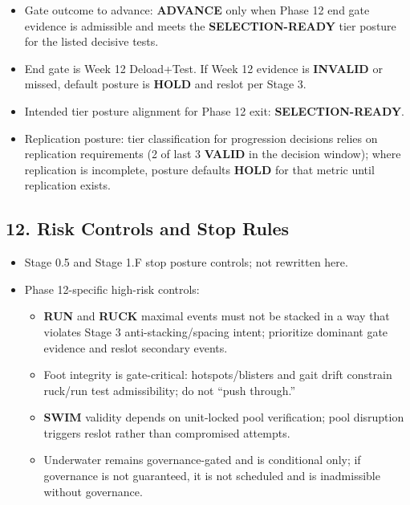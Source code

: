\documentclass[10pt]{article}
\begin{document}
\begin{itemize}
\item Gate outcome to advance: \textbf{ADVANCE} only when Phase 12 end gate evidence is admissible and meets the \textbf{SELECTION-READY} tier posture for the listed decisive tests.
\item End gate is Week 12 Deload+Test. If Week 12 evidence is \textbf{INVALID} or missed, default posture is \textbf{HOLD} and reslot per Stage 3.
\item Intended tier posture alignment for Phase 12 exit: \textbf{SELECTION-READY}.
\item Replication posture: tier classification for progression decisions relies on replication requirements (2 of last 3 \textbf{VALID} in the decision window); where replication is incomplete, posture defaults \textbf{HOLD} for that metric until replication exists.
\end{itemize}

\subsection*{12. Risk Controls and Stop Rules}


\begin{itemize}
\item Stage 0.5 and Stage 1.F stop posture controls; not rewritten here.
\item Phase 12-specific high-risk controls:
  \begin{itemize}
  \item \textbf{RUN} and \textbf{RUCK} maximal events must not be stacked in a way that violates Stage 3 anti-stacking/spacing intent; prioritize dominant gate evidence and reslot secondary events.
  \item Foot integrity is gate-critical: hotspots/blisters and gait drift constrain ruck/run test admissibility; do not “push through.”
  \item \textbf{SWIM} validity depends on unit-locked pool verification; pool disruption triggers reslot rather than compromised attempts.
  \item Underwater remains governance-gated and is conditional only; if governance is not guaranteed, it is not scheduled and is inadmissible without governance.
  \end{itemize}
\end{itemize}
\end{document}
